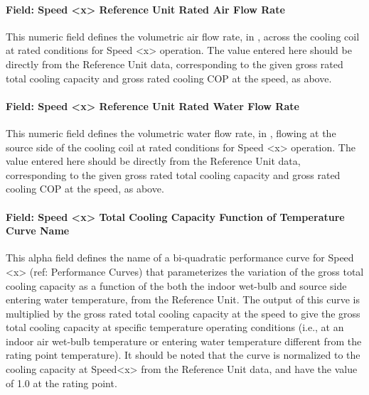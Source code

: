 \paragraph{Field: Speed \textless{}x\textgreater{} Reference Unit Rated Air Flow Rate}\label{field-speed-x-reference-unit-rated-air-flow-rate-2}

This numeric field defines the volumetric air flow rate, in \si{\volumeFlowRate}, across the cooling coil at rated conditions for Speed \textless{}x\textgreater{} operation. The value entered here should be directly from the Reference Unit data, corresponding to the given gross rated total cooling capacity and gross rated cooling COP at the speed, as above.

\paragraph{Field: Speed \textless{}x\textgreater{} Reference Unit Rated Water Flow Rate}\label{field-speed-x-reference-unit-rated-water-flow-rate}

This numeric field defines the volumetric water flow rate, in \si{\volumeFlowRate}, flowing at the source side of the cooling coil at rated conditions for Speed \textless{}x\textgreater{} operation. The value entered here should be directly from the Reference Unit data, corresponding to the given gross rated total cooling capacity and gross rated cooling COP at the speed, as above.

\paragraph{Field: Speed \textless{}x\textgreater{} Total Cooling Capacity Function of Temperature Curve Name}\label{field-speed-x-total-cooling-capacity-function-of-temperature-curve-name-2}

This alpha field defines the name of a bi-quadratic performance curve for Speed \textless{}x\textgreater{} (ref: Performance Curves) that parameterizes the variation of the gross total cooling capacity as a function of the both the indoor wet-bulb and source side entering water temperature, from the Reference Unit. The output of this curve is multiplied by the gross rated total cooling capacity at the speed to give the gross total cooling capacity at specific temperature operating conditions (i.e., at an indoor air wet-bulb temperature or entering water temperature different from the rating point temperature). It should be noted that the curve is normalized to the cooling capacity at Speed\textless{}x\textgreater{} from the Reference Unit data, and have the value of 1.0 at the rating point.

